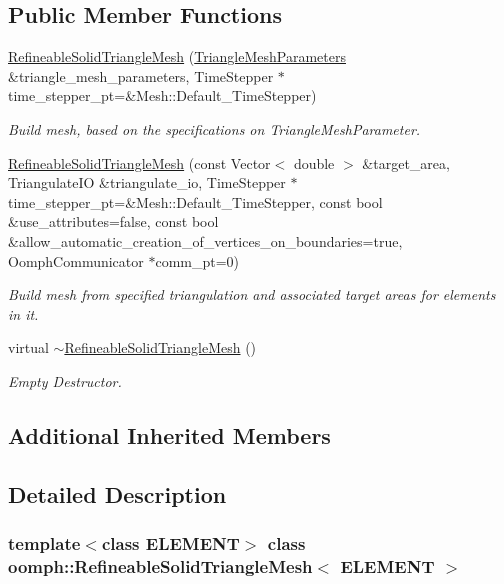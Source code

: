 \subsection*{Public Member Functions}
\begin{DoxyCompactItemize}
\item 
\hyperlink{classoomph_1_1RefineableSolidTriangleMesh_a813f756c2576d7ef129a603f4ac441ba}{Refineable\+Solid\+Triangle\+Mesh} (\hyperlink{classoomph_1_1TriangleMeshParameters}{Triangle\+Mesh\+Parameters} \&triangle\+\_\+mesh\+\_\+parameters, Time\+Stepper $\ast$time\+\_\+stepper\+\_\+pt=\&Mesh\+::\+Default\+\_\+\+Time\+Stepper)
\begin{DoxyCompactList}\small\item\em Build mesh, based on the specifications on Triangle\+Mesh\+Parameter. \end{DoxyCompactList}\item 
\hyperlink{classoomph_1_1RefineableSolidTriangleMesh_ab5924620ada32f8f95be71fd0bc6a110}{Refineable\+Solid\+Triangle\+Mesh} (const Vector$<$ double $>$ \&target\+\_\+area, Triangulate\+IO \&triangulate\+\_\+io, Time\+Stepper $\ast$time\+\_\+stepper\+\_\+pt=\&Mesh\+::\+Default\+\_\+\+Time\+Stepper, const bool \&use\+\_\+attributes=false, const bool \&allow\+\_\+automatic\+\_\+creation\+\_\+of\+\_\+vertices\+\_\+on\+\_\+boundaries=true, Oomph\+Communicator $\ast$comm\+\_\+pt=0)
\begin{DoxyCompactList}\small\item\em Build mesh from specified triangulation and associated target areas for elements in it. \end{DoxyCompactList}\item 
virtual \hyperlink{classoomph_1_1RefineableSolidTriangleMesh_a8b4ea32b78a6f80536dba20538452e7b}{$\sim$\+Refineable\+Solid\+Triangle\+Mesh} ()
\begin{DoxyCompactList}\small\item\em Empty Destructor. \end{DoxyCompactList}\end{DoxyCompactItemize}
\subsection*{Additional Inherited Members}


\subsection{Detailed Description}
\subsubsection*{template$<$class E\+L\+E\+M\+E\+NT$>$\newline
class oomph\+::\+Refineable\+Solid\+Triangle\+Mesh$<$ E\+L\+E\+M\+E\+N\+T $>$}

